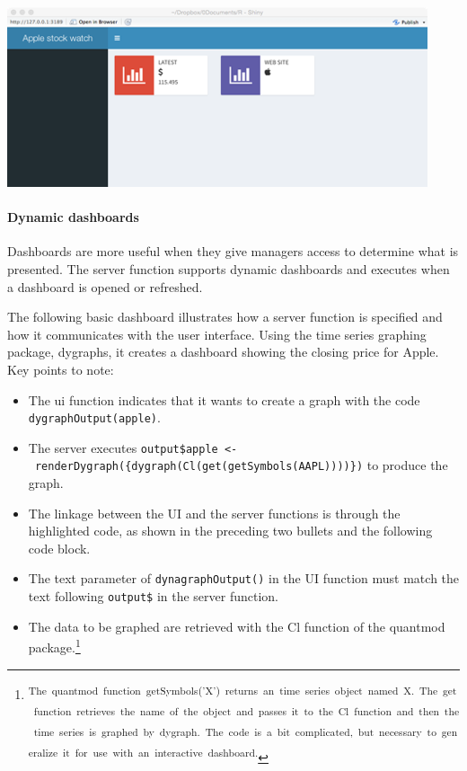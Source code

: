 \documentclass[
]{article}
\begin{document}
\includegraphics{Figures/Chapter 19/dashboard-6.png}

\hypertarget{dynamic-dashboards}{%
\paragraph*{Dynamic dashboards}\label{dynamic-dashboards}}

Dashboards are more useful when they give managers access to determine
what is presented. The server function supports dynamic dashboards and
executes when a dashboard is opened or refreshed.

The following basic dashboard illustrates how a server function is
specified and how it communicates with the user interface. Using the
time series graphing package, dygraphs, it creates a dashboard showing
the closing price for Apple. Key points to note:

\begin{itemize}
\item
  The ui function indicates that it wants to create a graph with the code
  \texttt{dygraphOutput(\textquotesingle{}apple\textquotesingle{})}.
\item
  The server executes \texttt{output\$apple\ \textless{}-\ renderDygraph(\{dygraph(Cl(get(getSymbols(\textquotesingle{}AAPL\textquotesingle{}))))\})}
  to produce the graph.
\item
  The linkage between the UI and the server functions is through the
  highlighted code, as shown in the preceding two bullets and the
  following code block.
\item
  The text parameter of \texttt{dynagraphOutput()} in the UI function must match the text following \texttt{output\$} in the server function.
\item
  The data to be graphed are retrieved with the Cl function of the quantmod package.\footnote{\textsuperscript{The~quantmod~function~getSymbols('X')~returns~an~time~series~object~named~X.~The~get~function~retrieves~the~name~of~the~object~and~passes~it~to~the~Cl~function~and~then~the~time~series~is~graphed~by~dygraph.~The~code~is~a~bit~complicated,~but~necessary~to~generalize~it~for~use~with~an~interactive~dashboard.}}
\end{itemize}
\end{document}

